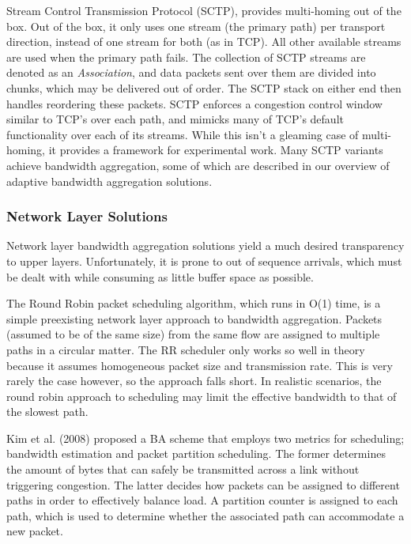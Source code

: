 \documentclass[12pt]{article}
\begin{document}
		Stream Control Transmission Protocol (SCTP), provides multi-homing out of the box. Out of the box, it only uses one stream (the primary path) per transport direction, instead of one stream for both (as in TCP). All other available streams are used when the primary path fails. The collection of SCTP streams are denoted as an {\it Association}, and data packets sent over them are divided into chunks, which may be delivered out of order. The SCTP stack on either end then handles reordering these packets. SCTP enforces a congestion control window similar to TCP's over each path, and mimicks many of TCP's default functionality over each of its streams\cite{5763587}. While this isn't a gleaming case of multi-homing, it provides a framework for experimental work. Many SCTP variants achieve bandwidth aggregation, some of which are described in our overview of adaptive bandwidth aggregation solutions.

	\subsubsection{Network Layer Solutions}

		Network layer bandwidth aggregation solutions yield a much desired transparency to upper layers. Unfortunately, it is prone to out of sequence arrivals, which must be dealt with while consuming as little buffer space as possible.

		The Round Robin packet scheduling algorithm, which runs in O(1) time, is a simple preexisting network layer approach to bandwidth aggregation. Packets (assumed to be of the same size) from the same flow are assigned to multiple paths in a circular matter. The RR scheduler only works so well in theory because it assumes homogeneous packet size and transmission rate. This is very rarely the case however, so the approach falls short. In realistic scenarios, the round robin approach to scheduling may limit the effective bandwidth to that of the slowest path.%

		Kim et al. (2008) proposed a BA scheme that employs two metrics for scheduling; bandwidth estimation and packet partition scheduling. The former determines the amount of bytes that can safely be transmitted across a link without triggering congestion. The latter decides how packets can be assigned to different paths in order to effectively balance load. A partition counter is assigned to each path, which is used to determine whether the associated path can accommodate a new packet\cite{kim2008packet}.
\end{document}
